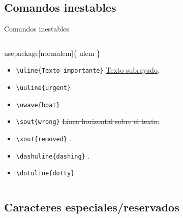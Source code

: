 \documentclass[aspectratio=169, 10pt]{beamer}
\begin{document}
\subsection{Comandos inestables}
\begin{frame}[fragile]{Comandos inestables}
    \begin{columns}
        \begin{column}{.8\linewidth}    
            \begin{block}{usepackage[normalem]\{ ulem \}}
            \begin{itemize} \pause
                \item \verb|\uline{Texto importante}|  \uline{Texto subrayado}.
                \item \verb|\uuline{urgent}| 
                \item \verb|\uwave{boat}| 
                \item \verb|\sout{wrong}| \sout{Línea horizontal sobre el texto.}
                \item \verb|\xout{removed}| .
                \item \verb|\dashuline{dashing}| .
                \item \verb|\dotuline{dotty}| 
                
            \end{itemize}
            \end{block} 
        \end{column}    
    \end{columns}
\end{frame}


\subsection{Caracteres especiales/reservados}
\end{document}
